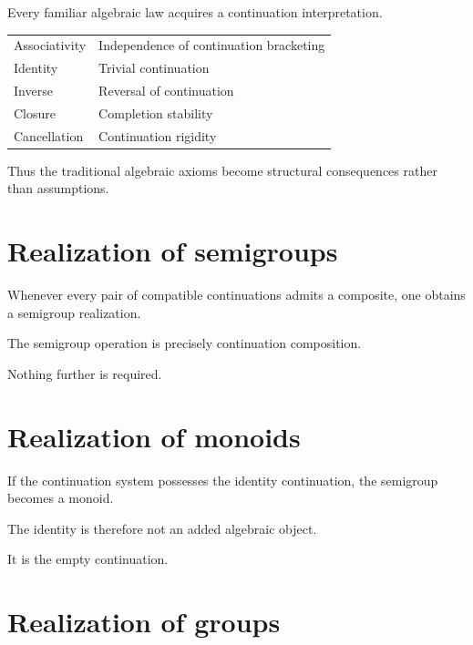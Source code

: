 \documentclass[13pt,openany]{book}
\theoremstyle{plain}
\theoremstyle{definition}
\begin{document}
Every familiar algebraic law acquires a continuation interpretation.

\begin{center}
\begin{tabular}{ll}
Associativity & Independence of continuation bracketing\\
Identity & Trivial continuation\\
Inverse & Reversal of continuation\\
Closure & Completion stability\\
Cancellation & Continuation rigidity
\end{tabular}
\end{center}

Thus the traditional algebraic axioms become structural consequences rather than assumptions.

\section{Realization of semigroups}

Whenever every pair of compatible continuations admits a composite, one obtains a semigroup realization.

The semigroup operation is precisely continuation composition.

Nothing further is required.

\section{Realization of monoids}

If the continuation system possesses the identity continuation, the semigroup becomes a monoid.

The identity is therefore not an added algebraic object.

It is the empty continuation.

\section{Realization of groups}
\end{document}
